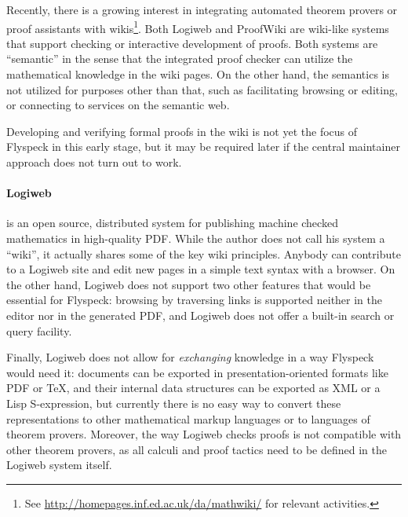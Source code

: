 \documentclass{llncs}
\begin{document}
Recently, there is a growing interest in integrating automated theorem provers or proof
assistants with wikis\footnote{See \url{http://homepages.inf.ed.ac.uk/da/mathwiki/} for
  relevant activities.}.  Both Logiweb and ProofWiki are wiki-like systems that support
checking or interactive development of proofs.  Both systems are ``semantic'' in the sense
that the integrated proof checker can utilize the mathematical knowledge in the wiki
pages.  On the other hand, the semantics is not utilized for purposes other than that,
such as facilitating browsing or editing, or connecting to services on the semantic
web.  

Developing and verifying formal proofs in the wiki is not yet the focus of Flyspeck in
this early stage, but it may be required later if the central maintainer approach does not
turn out to work.

\paragraph{Logiweb~\cite{Grue:Logiweb07}} is an open source, distributed system for
publishing machine checked mathematics in high-quality PDF.  While the author does not
call his system a ``wiki'', it actually shares some of the key wiki principles.  Anybody
can contribute to a Logiweb site and edit new pages in a simple text syntax with a
browser.  On the other hand, Logiweb does not support two other features that would be
essential for Flyspeck: browsing by traversing links is supported neither in the editor
nor in the generated PDF, and Logiweb does not offer a built-in search or query facility.

Finally, Logiweb does not allow for \emph{exchanging} knowledge in a way Flyspeck would
need it: documents can be exported in presentation-oriented formats like PDF or \TeX{},
and their internal data structures can be exported as XML or a Lisp S-expression, but
currently there is no easy way to convert these representations to other mathematical
markup languages or to languages of theorem provers.  Moreover, the way Logiweb checks
proofs is not compatible with other theorem provers, as all calculi and proof tactics need
to be defined in the Logiweb system itself.
\end{document}
